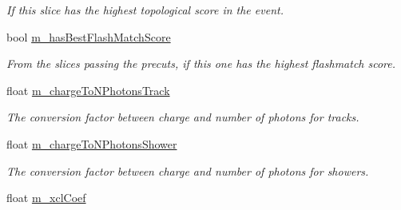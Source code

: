 \begin{DoxyCompactItemize}
\begin{DoxyCompactList}\small\item\em If this slice has the highest topological score in the event. \end{DoxyCompactList}\item 
bool \hyperlink{classflashmatch_1_1FlashMatchingTool_1_1SliceCandidate_a7358819de86b8111040e6b05be898630}{m\+\_\+has\+Best\+Flash\+Match\+Score}\hypertarget{classflashmatch_1_1FlashMatchingTool_1_1SliceCandidate_a7358819de86b8111040e6b05be898630}{}\label{classflashmatch_1_1FlashMatchingTool_1_1SliceCandidate_a7358819de86b8111040e6b05be898630}

\begin{DoxyCompactList}\small\item\em From the slices passing the precuts, if this one has the highest flashmatch score. \end{DoxyCompactList}\item 
float \hyperlink{classflashmatch_1_1FlashMatchingTool_1_1SliceCandidate_ae0a85f85fef8f21b6e48188d75d931c7}{m\+\_\+charge\+To\+N\+Photons\+Track}\hypertarget{classflashmatch_1_1FlashMatchingTool_1_1SliceCandidate_ae0a85f85fef8f21b6e48188d75d931c7}{}\label{classflashmatch_1_1FlashMatchingTool_1_1SliceCandidate_ae0a85f85fef8f21b6e48188d75d931c7}

\begin{DoxyCompactList}\small\item\em The conversion factor between charge and number of photons for tracks. \end{DoxyCompactList}\item 
float \hyperlink{classflashmatch_1_1FlashMatchingTool_1_1SliceCandidate_a82d6850177d95926ed59ec4722c37cba}{m\+\_\+charge\+To\+N\+Photons\+Shower}\hypertarget{classflashmatch_1_1FlashMatchingTool_1_1SliceCandidate_a82d6850177d95926ed59ec4722c37cba}{}\label{classflashmatch_1_1FlashMatchingTool_1_1SliceCandidate_a82d6850177d95926ed59ec4722c37cba}

\begin{DoxyCompactList}\small\item\em The conversion factor between charge and number of photons for showers. \end{DoxyCompactList}\item 
float \hyperlink{classflashmatch_1_1FlashMatchingTool_1_1SliceCandidate_ad903070f4430d2cdba484d4aa4036a13}{m\+\_\+xcl\+Coef}\hypertarget{classflashmatch_1_1FlashMatchingTool_1_1SliceCandidate_ad903070f4430d2cdba484d4aa4036a13}{}\label{classflashmatch_1_1FlashMatchingTool_1_1SliceCandidate_ad903070f4430d2cdba484d4aa4036a13}


\end{DoxyCompactItemize}
